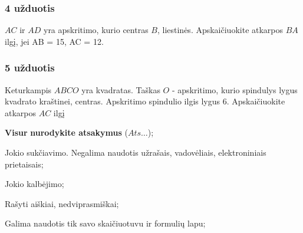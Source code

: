 \documentclass[a4paper]{article}
\begin{document}
\subsubsection*{4 užduotis}

\begin{minipage}[t]{0.28\textwidth}
      \centering
\end{minipage}\hfill
\begin{minipage}{0.69\textwidth}
      $AC$ ir $AD$ yra apskritimo, kurio centras $B$, liestinės. 
      Apskaičiuokite atkarpos $BA$ ilgį, jei AB = 15, AC = 12. 
\end{minipage}

\subsubsection*{5 užduotis}

\begin{minipage}[t]{0.28\textwidth}
      \centering
\end{minipage}\hfill
\begin{minipage}{0.69\textwidth}
      Keturkampis $ABCO$ yra kvadratas. Taškas $O$ - apskritimo,
      kurio spindulys lygus kvadrato kraštinei, centras.
      Apskritimo spindulio ilgis lygus $6$.
      Apskaičiuokite atkarpos $AC$ ilgį
\end{minipage}

\vfill
\begin{small}
      \begin{enumerate*}[label={(\arabic*)}]
            \item \textbf{Visur} \textbf{nurodykite atsakymus} ($Ats\ldots$);
            \item Jokio sukčiavimo. Negalima naudotis užrašais, vadovėliais,
            elektroniniais prietaisais;
            \item Jokio kalbėjimo;
            \item Rašyti aiškiai, nedviprasmiškai;
            \item Galima naudotis tik savo skaičiuotuvu ir formulių lapu;
      \end{enumerate*}
\end{small}
\end{document}
